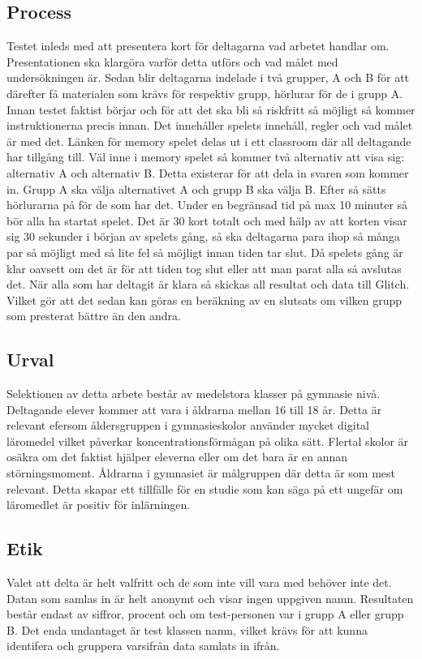 \documentclass[11p]{article}
\begin{document}
    \subsection{Process}
    Testet inleds med att presentera kort för deltagarna vad arbetet handlar om.
    Presentationen ska klargöra varför detta utförs och vad målet med undersökningen är.
    Sedan blir deltagarna indelade i två grupper, A och B för att därefter få materialen som krävs för respektiv grupp, hörlurar för de i grupp A.
    Innan testet faktist börjar och för att det ska bli så riskfritt så möjligt så kommer instruktionerna precis innan.
    Det innehåller spelets innehåll, regler och vad målet är med det.
    Länken för memory spelet delas ut i ett classroom där all deltagande har tillgång till.
    Väl inne i memory spelet så kommer två alternativ att visa sig: alternativ A och alternativ B.
    Detta existerar för att dela in svaren som kommer in.
    Grupp A ska välja alternativet A och grupp B ska välja B.
    \newline Efter så sätts hörlurarna på för de som har det.
    Under en begränsad tid på max 10 minuter så bör alla ha startat spelet.
    Det är 30 kort totalt och med hälp av att korten visar sig 30 sekunder i början av spelets gång, så ska deltagarna para ihop så många par så möjligt med så lite fel så möjligt innan tiden tar slut.
    Då spelets gång är klar oavsett om det är för att tiden tog slut eller att man parat alla så avslutas det.
    När alla som har deltagit är klara så skickas all resultat och data till Glitch.
    Vilket gör att det sedan kan göras en beräkning av en slutsats om vilken grupp som presterat bättre än den andra.



    \subsection{Urval}
    Selektionen av detta arbete består av medelstora klasser på gymnasie nivå.
    Deltagande elever kommer att vara i åldrarna mellan 16 till 18 år.
    Detta är relevant efersom åldersgruppen i gymnasieskolor använder mycket digital läromedel vilket påverkar koncentrationsförmågan på olika sätt.
    Flertal skolor är osäkra om det faktist hjälper eleverna eller om det bara är en annan störningsmoment.
    Åldrarna i gymnasiet är målgruppen där detta är som mest relevant.
    Detta skapar ett tillfälle för en studie som kan säga på ett ungefär om läromedlet är positiv för inlärningen.


    \subsection{Etik}
    Valet att delta är helt valfritt och de som inte vill vara med behöver inte det.
    Datan som samlas in är helt anonymt och visar ingen uppgiven namn.
    Resultaten består endast av siffror, procent och om test-personen var i grupp A eller grupp B.
    Det enda undantaget är test klassen namn, vilket krävs för att kunna identifera och gruppera varsifrån data samlats in ifrån.
\end{document}
